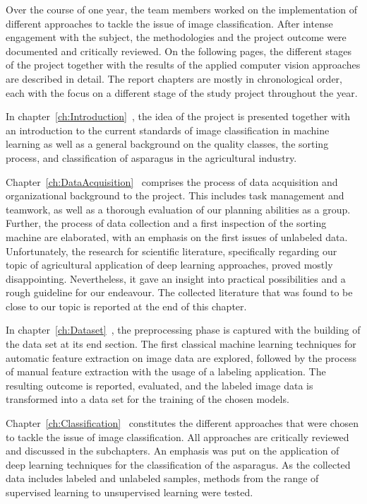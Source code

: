 Over the course of one year, the team members worked on the implementation of different approaches to tackle the issue of image classification. After intense engagement with the subject, the methodologies and the project outcome were documented and critically reviewed. On the following pages, the different stages of the project together with the results of the applied computer vision approaches are described in detail. The report chapters are mostly in chronological order, each with the focus on a different stage of the study project throughout the year.

\bigskip
In chapter~\ref{ch:Introduction}~, the idea of the project is presented together with an introduction to the current standards of image classification in machine learning as well as a general background on the quality classes, the sorting process, and classification of asparagus in the agricultural industry.

Chapter~\ref{ch:DataAcquisition}~ comprises the process of data acquisition and organizational background to the project. This includes task management and teamwork, as well as a thorough evaluation of our planning abilities as a group. Further, the process of data collection and a first inspection of the sorting machine are elaborated, with an emphasis on the first issues of unlabeled data. Unfortunately, the research for scientific literature, specifically regarding our topic of agricultural application of deep learning approaches, proved mostly disappointing. Nevertheless, it gave an insight into practical possibilities and a rough guideline for our endeavour. The collected literature that was found to be close to our topic is reported at the end of this chapter. 

In chapter~\ref{ch:Dataset}~, the preprocessing phase is captured with the building of the data set at its end section. The first classical machine learning techniques for automatic feature extraction on image data are explored, followed by the process of manual feature extraction with the usage of a labeling application. The resulting outcome is reported, evaluated, and the labeled image data is transformed into a data set for the training of the chosen models.

Chapter~\ref{ch:Classification}~ constitutes the different approaches that were chosen to tackle the issue of image classification. All approaches are critically reviewed and discussed in the subchapters. An emphasis was put on the application of deep learning techniques for the classification of the asparagus. As the collected data includes labeled and unlabeled samples, methods from the range of supervised learning to unsupervised learning were tested.

